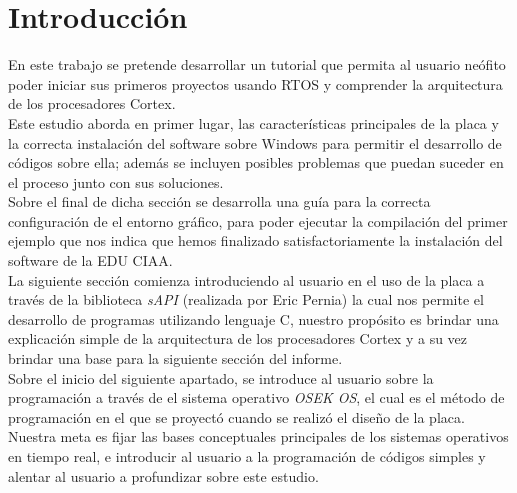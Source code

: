 \documentclass[12pt,letterpaper]{article}
\author{}
\date{}
\begin{document}
%

\tableofcontents


\section{Introducci\'on}
En este trabajo se pretende desarrollar un tutorial que permita al usuario neófito poder iniciar sus primeros proyectos usando RTOS y comprender la arquitectura de los procesadores Cortex.\\
Este estudio aborda en primer lugar, las características principales de la placa y la correcta instalación del software sobre Windows para permitir el desarrollo de códigos sobre ella; además se incluyen posibles problemas que puedan suceder en el proceso junto con sus soluciones.\\
Sobre el final de dicha sección se desarrolla una guía para la correcta configuración de el entorno gráfico, para poder ejecutar la compilación del primer ejemplo que nos indica que hemos finalizado satisfactoriamente la instalación del software de la EDU CIAA.\\
La siguiente sección comienza introduciendo al usuario en el uso de la placa a través de la biblioteca \textit{sAPI} (realizada por Eric Pernia) la cual nos permite el desarrollo de programas utilizando lenguaje C, nuestro propósito es brindar una explicación simple de la arquitectura de los procesadores Cortex y a su vez brindar una base para la siguiente sección del informe.\\
Sobre el inicio del siguiente apartado, se introduce al usuario sobre la programación a través de el sistema operativo \textit{OSEK OS}, el cual es el método de programación en el que se proyectó cuando se realizó el diseño de la placa. Nuestra meta es fijar las bases conceptuales principales de los sistemas operativos en tiempo real, e introducir al usuario a la programación de códigos simples y alentar al usuario a profundizar sobre este estudio.
\end{document}
